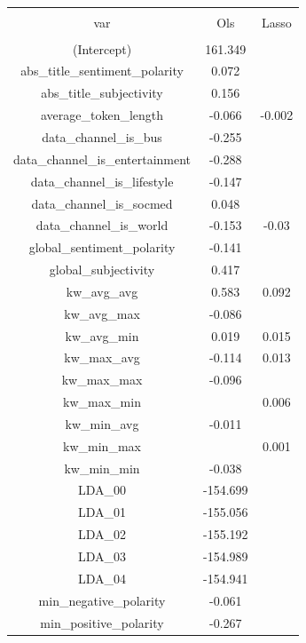 
\begin{table}[h] \centering 
  \caption{} 
  \label{} 
\begin{tabular}{@{\extracolsep{5pt}} ccc} 
\\[-1.8ex]\hline 
\hline \\[-1.8ex] 
var & Ols & Lasso \\ 
\hline \\[-1.8ex] 
(Intercept) & 161.349 &  \\ 
abs\_title\_sentiment\_polarity & 0.072 &  \\ 
abs\_title\_subjectivity & 0.156 &  \\ 
average\_token\_length & -0.066 & -0.002 \\ 
data\_channel\_is\_bus & -0.255 &  \\ 
data\_channel\_is\_entertainment & -0.288 &  \\ 
data\_channel\_is\_lifestyle & -0.147 &  \\ 
data\_channel\_is\_socmed & 0.048 &  \\ 
data\_channel\_is\_world & -0.153 & -0.03 \\ 
global\_sentiment\_polarity & -0.141 &  \\ 
global\_subjectivity & 0.417 &  \\ 
kw\_avg\_avg & 0.583 & 0.092 \\ 
kw\_avg\_max & -0.086 &  \\ 
kw\_avg\_min & 0.019 & 0.015 \\ 
kw\_max\_avg & -0.114 & 0.013 \\ 
kw\_max\_max & -0.096 &  \\ 
kw\_max\_min &  & 0.006 \\ 
kw\_min\_avg & -0.011 &  \\ 
kw\_min\_max &  & 0.001 \\ 
kw\_min\_min & -0.038 &  \\ 
LDA\_00 & -154.699 &  \\ 
LDA\_01 & -155.056 &  \\ 
LDA\_02 & -155.192 &  \\ 
LDA\_03 & -154.989 &  \\ 
LDA\_04 & -154.941 &  \\ 
min\_negative\_polarity & -0.061 &  \\ 
min\_positive\_polarity & -0.267 &  \\ 

\end{tabular}
\end{table}

